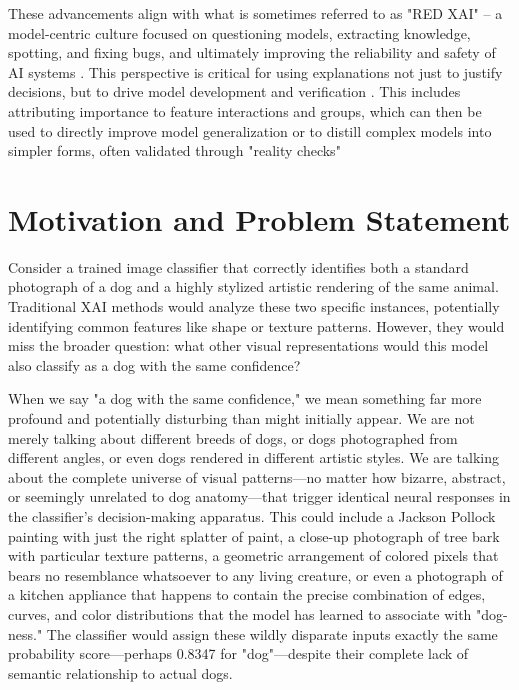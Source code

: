 \documentclass[licencjacka,en]{pracamgr}
\begin{document}
These advancements align with what is sometimes referred to as "RED XAI" – a model-centric culture focused on questioning models, extracting knowledge, spotting, and fixing bugs, and ultimately improving the reliability and safety of AI systems \citep{10.5555/3692070.3692231}. This perspective is critical for using explanations not just to justify decisions, but to drive model development and verification \citep{Tsai2022}. This includes attributing importance to feature interactions and groups, which can then be used to directly improve model generalization or to distill complex models into simpler forms, often validated through "reality checks" \citep{Singh2022}
\section{Motivation and Problem Statement}

Consider a trained image classifier that correctly identifies both a standard photograph of a dog and a highly stylized artistic rendering of the same animal. Traditional XAI methods would analyze these two specific instances, potentially identifying common features like shape or texture patterns. However, they would miss the broader question: what other visual representations would this model also classify as a dog with the same confidence?

When we say "a dog with the same confidence," we mean something far more profound and potentially disturbing than might initially appear. We are not merely talking about different breeds of dogs, or dogs photographed from different angles, or even dogs rendered in different artistic styles. We are talking about the complete universe of visual patterns—no matter how bizarre, abstract, or seemingly unrelated to dog anatomy—that trigger identical neural responses in the classifier's decision-making apparatus. This could include a Jackson Pollock painting with just the right splatter of paint, a close-up photograph of tree bark with particular texture patterns, a geometric arrangement of colored pixels that bears no resemblance whatsoever to any living creature, or even a photograph of a kitchen appliance that happens to contain the precise combination of edges, curves, and color distributions that the model has learned to associate with "dog-ness." The classifier would assign these wildly disparate inputs exactly the same probability score—perhaps 0.8347 for "dog"—despite their complete lack of semantic relationship to actual dogs.
\end{document}

